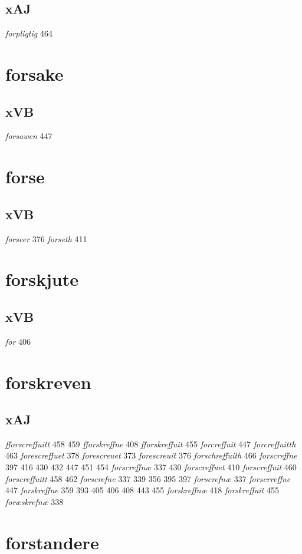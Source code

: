 \documentclass[a4paper,twocolumn]{article}
\begin{document}
\subsection{xAJ}
\label{sec:org1abd8c6}
\emph{forpligtig} 464 
\section{forsake}
\label{sec:org1ed0ed1}
\subsection{xVB}
\label{sec:orgfb7fbf1}
\emph{forsawen} 447 
\section{forse}
\label{sec:orgb7f4786}
\subsection{xVB}
\label{sec:org0fd3abb}
\emph{forseer} 376 \emph{forseth} 411 
\section{forskjute}
\label{sec:org77720f5}
\subsection{xVB}
\label{sec:org5b77f13}
\emph{for} 406 
\section{forskreven}
\label{sec:org9b47c2b}
\subsection{xAJ}
\label{sec:org89ecc8c}
\emph{fforscreffuitt} 458 459 \emph{fforskreffne} 408 \emph{fforskreffuit} 455 \emph{forcreffuit} 447 \emph{forcreffuitth} 463 \emph{forescreffuet} 378 \emph{forescreuet} 373 \emph{forescreuit} 376 \emph{forschreffuith} 466 \emph{forscreffne} 397 416 430 432 447 451 454 \emph{forscreffnæ} 337 430 \emph{forscreffuet} 410 \emph{forscreffuit} 460 \emph{forscreffuitt} 458 462 \emph{forscrefne} 337 339 356 395 397 \emph{forscrefnæ} 337 \emph{forscrreffne} 447 \emph{forskreffne} 359 393 405 406 408 443 455 \emph{forskreffnæ} 418 \emph{forskreffuit} 455 \emph{foræskrefnæ} 338 
\section{forstandere}
\label{sec:org95b93f7}
\end{document}
